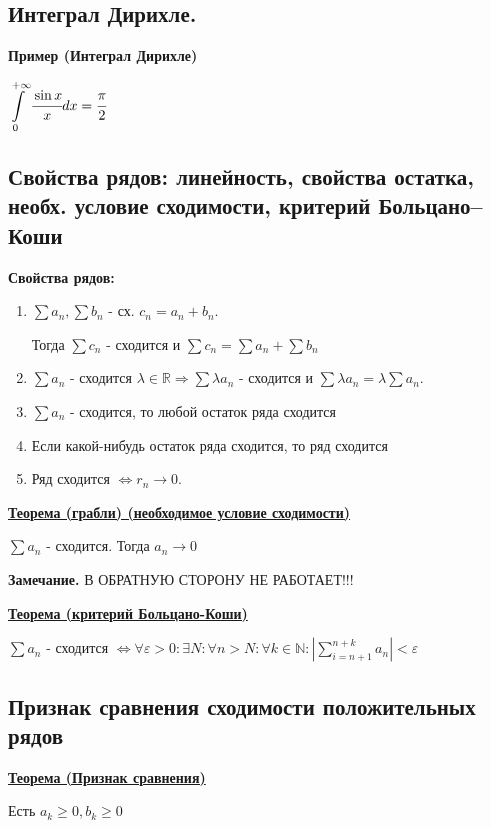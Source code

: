 \documentclass{article}
\newcommand{\integral}[2]{\displaystyle\int\limits_{#1}^{#2}}
\newcommand{\thmm}[1]{\underline{\textbf{#1}}}
\begin{document}
\subsection{Интеграл Дирихле.}

\textbf{Пример (Интеграл Дирихле)}

$\integral{0}{+\infty}\cfrac{\sin x}{x}dx  =\cfrac{\pi}{2}$

\subsection{Свойства рядов: линейность, свойства остатка, необх. условие сходимости, критерий Больцано--Коши}

\textbf{Свойства рядов:}

\begin{enumerate}
    \item $\sum a_n , \sum b_n$ - сх. $c_n = a_n + b_n$.

        Тогда $\sum c_n$ - сходится и $\sum c_n = \sum a_n + \sum b_n$
    \item $\sum a_n$  - сходится $\lambda\in \mathbb{R} \Rightarrow \sum\lambda a_n$ - сходится и $\sum \lambda a_n = \lambda \sum a_n$.
    \item $\sum a_n$ - сходится, то любой остаток ряда сходится
    \item Если какой-нибудь остаток ряда сходится, то ряд сходится
    \item Ряд сходится $\Leftrightarrow r_n \rightarrow 0 $.
\end{enumerate}

\thmm{Теорема (грабли) (необходимое условие сходимости)}

$\sum a_n$ - сходится. Тогда $a_n \rightarrow 0$


\textbf{Замечание.} В ОБРАТНУЮ СТОРОНУ НЕ РАБОТАЕТ!!!

\thmm{Теорема (критерий Больцано-Коши)}

$\sum a_n$ - сходится $\Leftrightarrow \forall \varepsilon>0: \exists N:\forall n > N: \forall k \in \mathbb{N}: |\sum\limits_{i=n+1}^{n+k}a_n|<\varepsilon$

\subsection{Признак сравнения сходимости положительных рядов}

\thmm{Теорема (Признак сравнения)}

Есть $a_k \geq 0 , b_k \geq 0$
\end{document}
